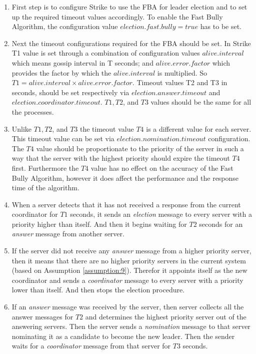 \documentclass[dareport.tex]{subfiles}
\begin{document}
\begin{enumerate}[leftmargin=*]
	\item First step is to configure Strike to use the FBA for leader election and to set up the required timeout values accordingly. To enable the Fast Bully Algorithm, the configuration value $election.fast.bully=true$ has to be set.
	\item Next the timeout configurations required for the FBA should be set. In Strike T1 value is set through a combination of configuration values $ alive.interval $ which means gossip interval in T seconds; and $ alive.error.factor $ which provides the factor by which the $ alive.interval $ is multiplied. So $ T1= alive.interval \times alive.error.factor $. Timeout values T2 and T3 in seconds, should be set respectively via $ election.answer.timeout $ and $ election.coordinator.timeout $. $T1, T2 $, and $ T3 $ values should be the same for all the processes.
	\item Unlike $ T1, T2 $, and $ T3 $ the timeout value $ T4 $ is a different value for each server. This timeout value can be set via $ election.nomination.timeout $ configuration. The $ T4 $ value should be proportionate to the priority of the server in such a way that the server with the highest priority should expire the timeout $ T4 $ first. Furthermore the $ T4 $ value has no effect on the accuracy of the Fast Bully Algorithm, however it does affect the performance and the response time of the algorithm.
	\item When a server detects that it has not received a response from the current coordinator for $ T1 $ seconds, it sends an \emph{election} message to every server with a priority higher than itself. And then it begins waiting for $ T2 $ seconds for an \emph{answer} message from another server.
	\item If the server did not receive any \emph{answer} message from a higher priority server, then it means that there are no higher priority servers in the current system (based on Assumption \ref{assumption:9}). Therefor it appoints itself as the new coordinator and sends a \emph{coordinator} message to every server with a priority lower than itself. And then stops the election procedure.
	\item If an \emph{answer} message was received by the server, then server collects all the answer messages for $ T2 $ and determines the highest priority server out of the answering servers. Then the server sends a \emph{nomination} message to that server nominating it as a candidate to become the new leader. Then the sender waits for a \emph{coordinator} message from that server for $ T3 $ seconds.

\end{enumerate}
\end{document}

